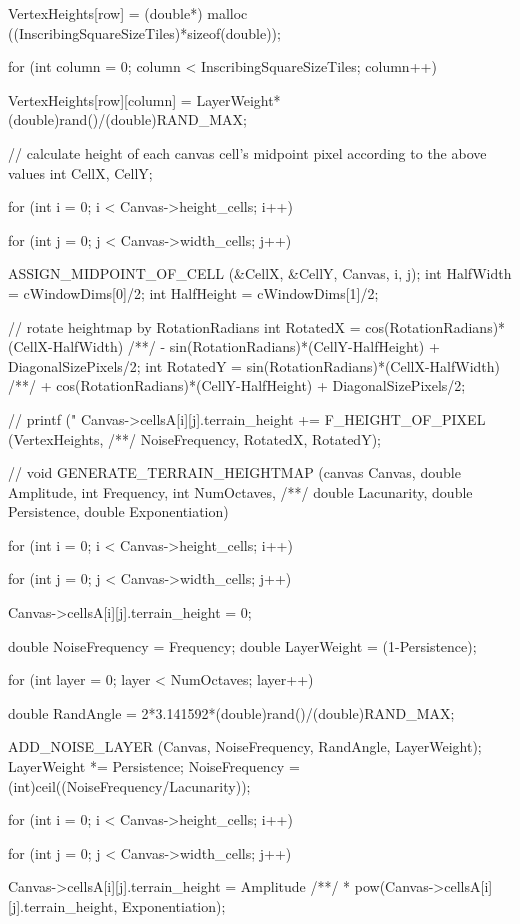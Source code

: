 \begin{C}
{{		VertexHeights[row] = (double*) malloc ((InscribingSquareSizeTiles)*sizeof(double));
		
		for (int column = 0; column < InscribingSquareSizeTiles; column++){
			
			VertexHeights[row][column] = LayerWeight*(double)rand()/(double)RAND_MAX;
		}
	}
	
	// calculate height of each canvas cell's midpoint pixel according to the above values
	int CellX, CellY;
	
	for (int i = 0; i < Canvas->height_cells; i++){
		for (int j = 0; j < Canvas->width_cells; j++){
			
			ASSIGN_MIDPOINT_OF_CELL (&CellX, &CellY, Canvas, i, j);
			int HalfWidth = cWindowDims[0]/2;
			int HalfHeight = cWindowDims[1]/2;
			
			// rotate heightmap by RotationRadians
			int RotatedX = cos(RotationRadians)*(CellX-HalfWidth)
			/**/ - sin(RotationRadians)*(CellY-HalfHeight) + DiagonalSizePixels/2;
			int RotatedY = sin(RotationRadians)*(CellX-HalfWidth)
			/**/ + cos(RotationRadians)*(CellY-HalfHeight) + DiagonalSizePixels/2;
			
			// printf ("%
			Canvas->cellsA[i][j].terrain_height += F_HEIGHT_OF_PIXEL (VertexHeights,
			/**/ NoiseFrequency, RotatedX, RotatedY);
		}
	}
}


// 
void GENERATE_TERRAIN_HEIGHTMAP (canvas Canvas, double Amplitude, int Frequency, int NumOctaves,
/**/ double Lacunarity, double Persistence, double Exponentiation){
	
	for (int i = 0; i < Canvas->height_cells; i++){
		for (int j = 0; j < Canvas->width_cells; j++){
			
			Canvas->cellsA[i][j].terrain_height = 0;
		}
	}
	
	double NoiseFrequency = Frequency;
	double LayerWeight = (1-Persistence);
	
	for (int layer = 0; layer < NumOctaves; layer++){
		
		double RandAngle = 2*3.141592*(double)rand()/(double)RAND_MAX;
		
		ADD_NOISE_LAYER (Canvas, NoiseFrequency, RandAngle, LayerWeight);
		LayerWeight *= Persistence;
		NoiseFrequency = (int)ceil((NoiseFrequency/Lacunarity));
	}
	for (int i = 0; i < Canvas->height_cells; i++){
		for (int j = 0; j < Canvas->width_cells; j++){
			
			Canvas->cellsA[i][j].terrain_height = Amplitude
			/**/ * pow(Canvas->cellsA[i][j].terrain_height, Exponentiation);
		}
	}
}
\end{C}
